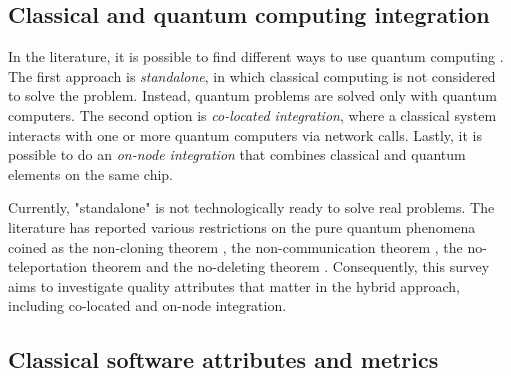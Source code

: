 \subsection{Classical and quantum computing integration}

In the literature, it is possible to find different ways to use quantum computing \cite{Elsharkawy2023}. The first approach is \emph{standalone}, in which classical computing is not considered to solve the problem. Instead, quantum problems are solved only with quantum computers. The second option is \emph{co-located integration}, where a classical system interacts with one or more quantum computers via network calls. Lastly, it is possible to do an \emph{on-node integration} that combines classical and quantum elements on the same chip.

Currently, "standalone" is not technologically ready to solve real problems. The literature has reported various restrictions on the pure quantum phenomena coined as the non-cloning theorem \cite{Wootters_Zurek_1982}, the non-communication theorem \cite{Popescu_Rohrlich_1998}, the no-teleportation theorem \cite{Pathak_2013} and the no-deleting theorem \cite{Kumar_Pati_Braunstein_2000}. Consequently, this survey aims to investigate quality attributes that matter in the hybrid approach, including co-located and on-node integration.


\subsection{Classical software attributes and metrics}

